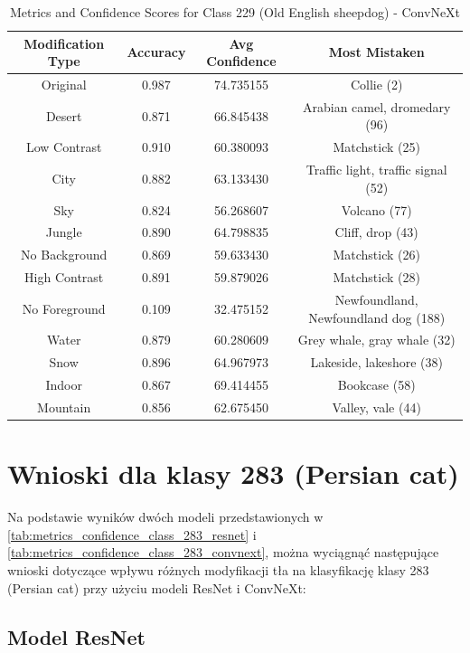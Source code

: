 \begin{table}
	\centering
	\begin{tabular}{|c|c|c|c|}
		\hline
		\textbf{Modification Type} & \textbf{Accuracy} & \textbf{Avg Confidence} & \textbf{Most Mistaken} \\
		\hline
		Original & 0.987 & 74.735155 & Collie (2) \\
		\hline
		Desert & 0.871 & 66.845438 & Arabian camel, dromedary (96) \\
		\hline
		Low Contrast & 0.910 & 60.380093 & Matchstick (25) \\
		\hline
		City & 0.882 & 63.133430 & Traffic light, traffic signal (52) \\
		\hline
		Sky & 0.824 & 56.268607 & Volcano (77) \\
		\hline
		Jungle & 0.890 & 64.798835 & Cliff, drop (43) \\
		\hline
		No Background & 0.869 & 59.633430 & Matchstick (26) \\
		\hline
		High Contrast & 0.891 & 59.879026 & Matchstick (28) \\
		\hline
		No Foreground & 0.109 & 32.475152 & Newfoundland, Newfoundland dog (188) \\
		\hline
		Water & 0.879 & 60.280609 & Grey whale, gray whale (32) \\
		\hline
		Snow & 0.896 & 64.967973 & Lakeside, lakeshore (38) \\
		\hline
		Indoor & 0.867 & 69.414455 & Bookcase (58) \\
		\hline
		Mountain & 0.856 & 62.675450 & Valley, vale (44) \\
		\hline
	\end{tabular}
	\caption{Metrics and Confidence Scores for Class 229 (Old English sheepdog) - ConvNeXt}
	\label{tab:metrics_confidence_class_229_convnext}
\end{table}

\section*{Wnioski dla klasy 283 (Persian cat)}

Na podstawie wyników dwóch modeli przedstawionych w \ref*{tab:metrics_confidence_class_283_resnet} i \ref*{tab:metrics_confidence_class_283_convnext}, można wyciągnąć następujące wnioski dotyczące wpływu różnych 
modyfikacji tła na klasyfikację klasy 283 (Persian cat) przy użyciu modeli ResNet i ConvNeXt:

\subsection*{Model ResNet}

